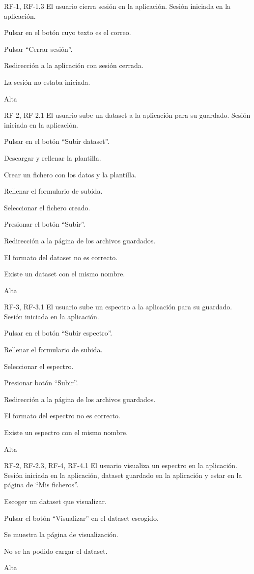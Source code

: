 {RF-1, RF-1.3}
{El usuario cierra sesión en la aplicación.}
{Sesión iniciada en la aplicación.}
{
	\item Pulsar en el botón cuyo texto es el correo.
	\item Pulsar ``Cerrar sesión''.
}
{Redirección a la aplicación con sesión cerrada.}
{	\item La sesión no estaba iniciada.
}
{Alta}

{RF-2, RF-2.1}
{El usuario sube un dataset a la aplicación para su guardado.}
{Sesión iniciada en la aplicación.}
{
	\item Pulsar en el botón ``Subir dataset''.
	\item Descargar y rellenar la plantilla.
	\item Crear un fichero  con los datos y la plantilla.
	\item Rellenar el formulario de subida.
	\item Seleccionar el fichero creado.
	\item Presionar el botón ``Subir''.
}
{Redirección a la página de los archivos guardados.}
{	\item El formato del dataset no es correcto.
	\item Existe un dataset con el mismo nombre.
}
{Alta}

{RF-3, RF-3.1}
{El usuario sube un espectro a la aplicación para su guardado.}
{Sesión iniciada en la aplicación.}
{
	\item Pulsar en el botón ``Subir espectro''.
	\item Rellenar el formulario de subida.
	\item Seleccionar el espectro.
	\item Presionar botón ``Subir''.
}
{Redirección a la página de los archivos guardados.}
{	\item El formato del espectro no es correcto.
	\item Existe un espectro con el mismo nombre.
}
{Alta}

{RF-2, RF-2.3, RF-4, RF-4.1}
{El usuario visualiza un espectro en la aplicación.}
{Sesión iniciada en la aplicación, dataset guardado en la aplicación y estar en 
la página de ``Mis ficheros''.}
{
	\item Escoger un dataset que visualizar.
	\item Pulsar el botón ``Visualizar'' en el dataset escogido.
}
{Se muestra la página de visualización.}
{	\item No se ha podido cargar el dataset.
}
{Alta}

